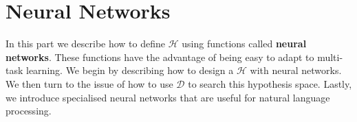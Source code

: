 \chapter{Neural Networks}
\label{neural_networks}

In this part we describe how to define $\mathcal{H}$ using functions called \textbf{neural networks}. These functions have the advantage of being easy to adapt to multi-task learning. We begin by describing how to design a $\mathcal{H}$ with neural networks. We then turn to the issue of how to use $\mathcal{D}$ to search this hypothesis space. Lastly, we introduce specialised neural networks that are useful for natural language processing.




